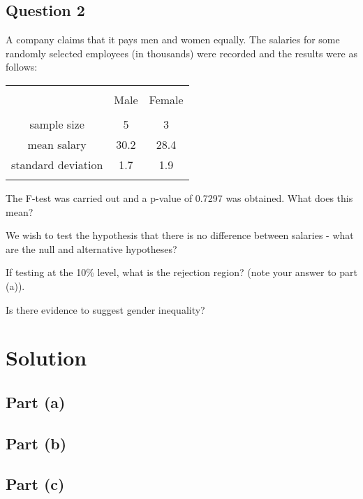 \documentclass[a4paper,12pt]{article}
\begin{document}
\large 

\subsection*{Question 2}
A company claims that it pays men and women equally. The salaries for some randomly selected employees (in thousands) were recorded and the results were as follows:\\
\begin{center}
\begin{tabular}{|c|c|c|}
\hline
&&\\[-0.4cm]
& Male & Female \\
\hline
&&\\[-0.4cm]
sample size & 5 & 3 \\
mean salary & 30.2 & 28.4 \\
standard deviation & 1.7 & 1.9 \\
\hline
\multicolumn{3}{c}{}\\[-0.3cm]
\end{tabular}
\end{center}

\item The F-test was carried out and a p-value of 0.7297 was obtained. What does this mean? 

 \item We wish to test the hypothesis that there is no difference between salaries - what are the null and alternative hypotheses? 
 \item If testing at the 10\% level, what is the rejection region? (note your answer to part (a)). 
 \item Is there evidence to suggest gender inequality?

\section*{Solution}

\subsection*{Part (a)}

\subsection*{Part (b)}

\subsection*{Part (c)}	
\end{document}
